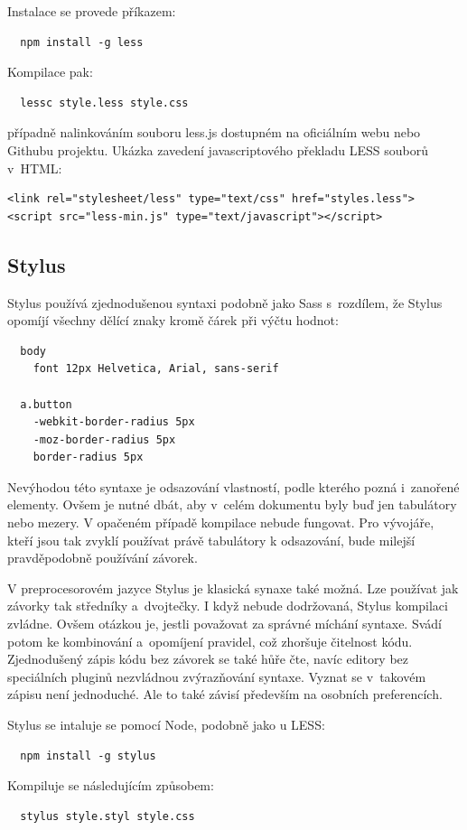 \documentclass[thesis=B,czech]{FITthesis}[2012/06/26]
\begin{document}
\noindent Instalace se provede příkazem:
\scriptsize
\begin{verbatim}
  npm install -g less
\end{verbatim}
\normalsize
Kompilace pak:
\scriptsize
\begin{verbatim}
  lessc style.less style.css 
\end{verbatim}
\normalsize
případně nalinkováním souboru less.js dostupném na  oficiálním webu nebo Githubu projektu. Ukázka zavedení javascriptového překladu LESS souborů v~HTML:
\scriptsize
\begin{verbatim}
<link rel="stylesheet/less" type="text/css" href="styles.less">
<script src="less-min.js" type="text/javascript"></script>
\end{verbatim}
\normalsize

\subsection{Stylus}

Stylus používá zjednodušenou syntaxi podobně jako Sass s~rozdílem, že Stylus opomíjí všechny dělící znaky kromě čárek při výčtu hodnot:
\scriptsize
\begin{verbatim}
  body
    font 12px Helvetica, Arial, sans-serif

  a.button
    -webkit-border-radius 5px
    -moz-border-radius 5px
    border-radius 5px
\end{verbatim}
\normalsize
Nevýhodou této syntaxe je odsazování vlastností, podle kterého pozná i~zanořené elementy. Ovšem  je nutné dbát, aby v~celém dokumentu byly buď jen tabulátory nebo mezery. V opačeném případě kompilace nebude fungovat. Pro vývojáře, kteří jsou tak zvyklí používat právě tabulátory k odsazování, bude milejší pravděpodobně používání závorek. 

V preprocesorovém jazyce Stylus je klasická synaxe také možná. Lze používat jak závorky tak středníky a~dvojtečky. I když nebude dodržovaná, Stylus kompilaci zvládne. Ovšem otázkou je, jestli považovat za správné míchání syntaxe. Svádí potom ke kombinování a~opomíjení pravidel, což zhoršuje čitelnost kódu. Zjednodušený zápis kódu bez závorek se také hůře čte, navíc editory bez speciálních pluginů nezvládnou zvýrazňování syntaxe. Vyznat se v~takovém zápisu není jednoduché. Ale to také závisí především na osobních preferencích.

Stylus se intaluje se pomocí Node, podobně jako u LESS:
\scriptsize
\begin{verbatim}
  npm install -g stylus
\end{verbatim}
\normalsize
Kompiluje se následujícím způsobem:
\scriptsize
\begin{verbatim}
  stylus style.styl style.css
\end{verbatim}
\normalsize
\end{document}
